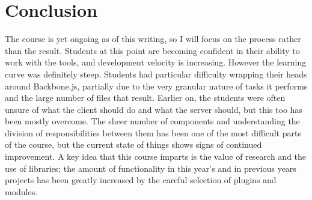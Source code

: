 \documentclass[12pt]{article}
\begin{document}
\section{Conclusion}\label{sec:conclusion}
The course is yet ongoing as of this writing, so I will focus on the process rather than the result. Students at this point are becoming confident in their ability to work with the tools, and development velocity is increasing. However the learning curve was definitely steep. Students had particular difficulty wrapping their heads around Backbone.js, partially due to the very granular nature of tasks it performs and the large number of files that result. Earlier on, the students were often unsure of what the client should do and what the server should, but this too has been mostly overcome. The sheer number of components and understanding the division of responsibilities between them has been one of the most  difficult parts of the course, but the current state of things shows signs of continued improvement. A key idea that this course imparts is the value of research and the use of libraries; the amount of functionality in this year's and in previous years projects has been greatly increased by the careful selection of plugins and modules.



%
%




%  
%
%


\end{document}
